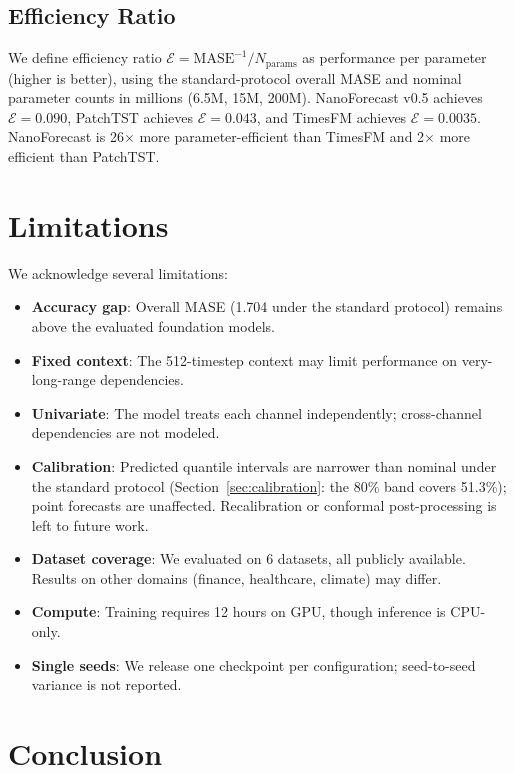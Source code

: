 \documentclass[11pt]{article}
\begin{document}
\subsection{Efficiency Ratio}
We define efficiency ratio $\mathcal{E} = \text{MASE}^{-1} / N_{\text{params}}$ as performance per parameter (higher is better), using the standard-protocol overall MASE and nominal parameter counts in millions (6.5M, 15M, 200M). NanoForecast v0.5 achieves $\mathcal{E} = 0.090$, PatchTST achieves $\mathcal{E} = 0.043$, and TimesFM achieves $\mathcal{E} = 0.0035$. NanoForecast is 26$\times$ more parameter-efficient than TimesFM and 2$\times$ more efficient than PatchTST.

\section{Limitations}
\label{sec:limitations}

We acknowledge several limitations:

\begin{itemize}
\item \textbf{Accuracy gap}: Overall MASE (1.704 under the standard protocol) remains above the evaluated foundation models.
\item \textbf{Fixed context}: The 512-timestep context may limit performance on very-long-range dependencies.
\item \textbf{Univariate}: The model treats each channel independently; cross-channel dependencies are not modeled.
\item \textbf{Calibration}: Predicted quantile intervals are narrower than nominal under the standard protocol (Section~\ref{sec:calibration}: the 80\% band covers 51.3\%); point forecasts are unaffected. Recalibration or conformal post-processing is left to future work.
\item \textbf{Dataset coverage}: We evaluated on 6 datasets, all publicly available. Results on other domains (finance, healthcare, climate) may differ.
\item \textbf{Compute}: Training requires 12 hours on GPU, though inference is CPU-only.
\item \textbf{Single seeds}: We release one checkpoint per configuration; seed-to-seed variance is not reported.
\end{itemize}

\section{Conclusion}
\label{sec:conclusion}
\end{document}
